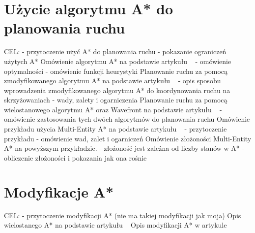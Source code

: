 \section{Użycie algorytmu A* do planowania ruchu}

CEL:
\newline
- przytoczenie użyć A* do planowania ruchu
\newline
- pokazanie ograniczeń użytych A*
\newline
\newline
Omówienie algorytmu A* na podstawie artykułu ~\cite{dechter1985generalized} 
\newline
- omówienie optymalności
\newline
- omówienie funkcji heurystyki
\newline
\newline
Planowanie ruchu za pomocą zmodyfikowanego algorytmu A* na podstawie artykułu ~\cite{munteanmobile} 
\newline
- opis sposobu wprowadzenia zmodyfikowanego algorytmu A* do koordynowania ruchu na skrzyżowaniach
\newline
- wady, zalety i ogarniczenia
\newline
\newline
Planowanie ruchu za pomocą wielostanowego algorytmu A* oraz Wavefront na podstawie artykułu ~\cite{wojnicki2015robust} 
\newline
- omówienie zastosowania tych dwóch algorytmów do planowania ruchu
\newline
\newline
Omówienie przykładu użycia Multi-Entity A* na podstawie artykułu ~\cite{wojnicki2015robust} 
\newline
- przytoczenie przykładu
\newline
- omówienie wad, zalet i ogarniczeń
\newline
\newline
Omówienie złożoności Multi-Entity A* na powyższym przykładzie.
\newline
- złożoność jest zależna od liczby stanów w A*
\newline
- obliczenie złożoności i pokazania jak ona rośnie
\newline
\newline

\section{Modyfikacje A*}

CEL:
\newline
- przytoczenie modyfikacji A* (nie ma takiej modyfikacji jak moja)
\newline
\newline
Opis wielostanego A* na podstawie artykułu ~\cite{wojnicki2015robust} 
\newline
\newline
Opis modyfikacji A* w artykule ~\cite{munteanmobile}
\newline
\newline
